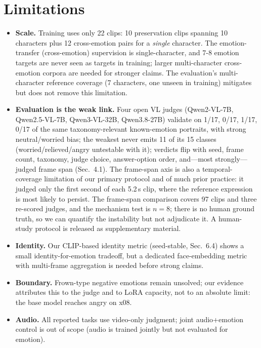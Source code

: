\documentclass[10pt,twocolumn]{article}
\begin{document}
\section{Limitations}
\begin{itemize}
\item \textbf{Scale.} Training uses only 22 clips: 10 preservation clips spanning 10 characters
plus 12 cross-emotion pairs for a \emph{single} character. The emotion-transfer (cross-emotion)
supervision is single-character, and 7-8 emotion targets are never seen as targets in training;
larger multi-character cross-emotion corpora are needed for stronger claims. The evaluation's
multi-character reference coverage (7 characters, one unseen in training) mitigates but does not
remove this limitation.
\item \textbf{Evaluation is the weak link.} Four open VL judges (Qwen2-VL-7B, Qwen2.5-VL-7B,
Qwen3-VL-32B, Qwen3.8-27B) validate on 1/17, 0/17, 1/17, 0/17 of the same taxonomy-relevant
known-emotion portraits, with strong neutral/worried bias; the weakest never emits 11 of its 15
classes (worried/relieved/angry untestable with it); verdicts flip with seed, frame count, taxonomy,
judge choice, answer-option order, and---most strongly---judged frame span (Sec.~4.1). The frame-span
axis is also a temporal-coverage limitation of our primary protocol and of much prior practice: it
judged only the first second of each 5.2\,s clip, where the reference expression is most likely to
persist. The frame-span comparison covers 97 clips and three re-scored judges, and the mechanism test is
$n{=}8$; there is no human ground truth, so we can quantify the instability but not adjudicate it. A
human-study protocol is released as supplementary material.
\item \textbf{Identity.} Our CLIP-based identity metric (seed-stable, Sec.~6.4) shows a small
identity-for-emotion tradeoff, but a dedicated face-embedding metric with multi-frame aggregation
is needed before strong claims.
\item \textbf{Boundary.} Frown-type negative emotions remain unsolved; our evidence attributes
this to the judge and to LoRA capacity, not to an absolute limit: the base model reaches angry on x08.
\item \textbf{Audio.} All reported tasks use video-only judgment; joint audio+emotion control is
out of scope (audio is trained jointly but not evaluated for emotion).
\end{itemize}
\end{document}
